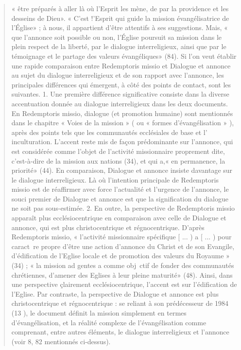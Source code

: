 \begin{quote}
« être préparés à aller là où l'Esprit les mène, de par la providence
et les desseins de Dieu». « C'est !'Esprit qui guide la
mission évangélisatrice de l'Église» ; à nous, il appartient
d'être attentifs à ses suggestions. Mais, « que l'annonce soit
possible ou non, l'Église poursuit sa mission dans le plein respect
de la liberté, par le dialogue interreligieux, ainsi que par
le témoignage et le partage des valeurs évangéliques» (84).
Si l'on veut établir une rapide comparaison entre Redemptoris
missio et Dialogue et annonce au sujet du dialogue interreligieux
et de son rapport avec l'annonce, les principales
différences qui émergent, à côté des points de contact, sont les
suivantes.
1. Une première différence significative consiste dans la
diverse accentuation donnée au dialogue interreligieux dans
les deux documents. En Redemptoris missio, dialogue (et promotion
humaine) sont mentionnés dans le chapitre « Voies de
la mission » ( ou « formes d'évangélisation » ), après des points
tels que les communautés ecclésiales de base et l' inculturation.
L'accent reste mis de façon prédominante sur l'annonce, qui
est considérée comme l'objet de l'activité missionnaire proprement
dite, c'est-à-dire de la mission aux nations (34), et qui
a,« en permanence, la priorité» (44). En comparaison, Dialogue
et annonce insiste davantage sur le dialogue interreligieux. Là
où l'intention principale de Redemptoris missio est de réaffirmer
avec force l'actualité et l'urgence de l'annonce, le souci
premier de Dialogue et annonce est que la signification du
dialogue ne soit pas sous-estimée.
2. En outre, la perspective de Redemptoris missio apparaît
plus ecclésiocentrique en comparaison avec celle de Dialogue
et annonce, qui est plus christocentrique et régnocentrique.
D'après Redemptoris missio, « l'activité missionnaire spécifique
[ ... ) a [ ... ) pour caract~re propre d'être une action d'annonce
du Christ et de son Evangile, d'édification de l'Eglise
locale et de promotion des valeurs du Royaume » (34) ; « la
mission ad gentes a comme obj~ctif de fonder des communautés
chrétiennes, d'amener des Eglises à leur pleine maturité»
(48). Ainsi, dans une perspective çlairement ecclésiocentrique,
l'accent est sur l'édification de l'Eglise. Par contraste, la perspective
de Dialogue et annonce est plus christocentrique et
régnocentrique : se reliant à son prédécesseur de 1984 (13 ), le
document définit la mission simplement en termes d'évangélisation,
et la réalité complexe de l'évangélisation comme
comprenant, entre autres éléments, le dialogue interreligieux
et l'annonce (voir 8, 82 mentionnés ci-dessus).

\end{quote}
